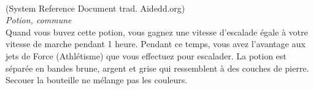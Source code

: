 \\
{\small (System Reference Document trad. Aidedd.org)}\\
{\small \it Potion, commune}\\
Quand vous buvez cette potion, vous gagnez une vitesse d'escalade égale à votre vitesse de marche pendant 1 heure. Pendant ce temps, vous avez l'avantage aux jets de Force (Athlétisme) que vous effectuez pour escalader. La potion est séparée en bandes brune, argent et grise qui ressemblent à des couches de pierre. Secouer la bouteille ne mélange pas les couleurs. \\

